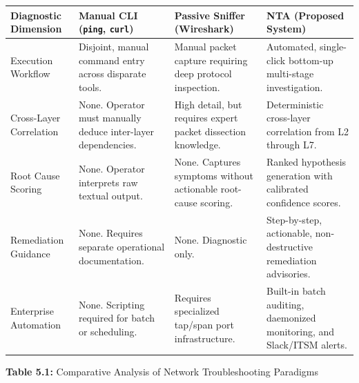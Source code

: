 \documentclass[
]{article}
\newcounter{none} %
\begin{document}
{\def\LTcaptype{none} %
\begin{longtable}[]{@{}
  >{\raggedright\arraybackslash}p{}
  >{\raggedright\arraybackslash}p{}
  >{\raggedright\arraybackslash}p{}
  >{\raggedright\arraybackslash}p{}@{}}
\toprule\noalign{}
\begin{minipage}[b]{\linewidth}\raggedright
\textbf{Diagnostic Dimension}
\end{minipage} & \begin{minipage}[b]{\linewidth}\raggedright
\textbf{Manual CLI (\texttt{ping}, \texttt{curl})}
\end{minipage} & \begin{minipage}[b]{\linewidth}\raggedright
\textbf{Passive Sniffer (Wireshark)}
\end{minipage} & \begin{minipage}[b]{\linewidth}\raggedright
\textbf{NTA (Proposed System)}
\end{minipage} \\
\midrule\noalign{}
\endhead
\bottomrule\noalign{}
\endlastfoot
Execution Workflow & Disjoint, manual command entry across disparate tools. & Manual packet capture requiring deep protocol inspection. & Automated, single-click bottom-up multi-stage investigation. \\
Cross-Layer Correlation & None. Operator must manually deduce inter-layer dependencies. & High detail, but requires expert packet dissection knowledge. & Deterministic cross-layer correlation from L2 through L7. \\
Root Cause Scoring & None. Operator interprets raw textual output. & None. Captures symptoms without actionable root-cause scoring. & Ranked hypothesis generation with calibrated confidence scores. \\
Remediation Guidance & None. Requires separate operational documentation. & None. Diagnostic only. & Step-by-step, actionable, non-destructive remediation advisories. \\
Enterprise Automation & None. Scripting required for batch or scheduling. & Requires specialized tap/span port infrastructure. & Built-in batch auditing, daemonized monitoring, and Slack/ITSM alerts. \\
\end{longtable}
}

\begin{center}
\textbf{Table 5.1:} Comparative Analysis of Network Troubleshooting Paradigms
\end{center}
\end{document}
